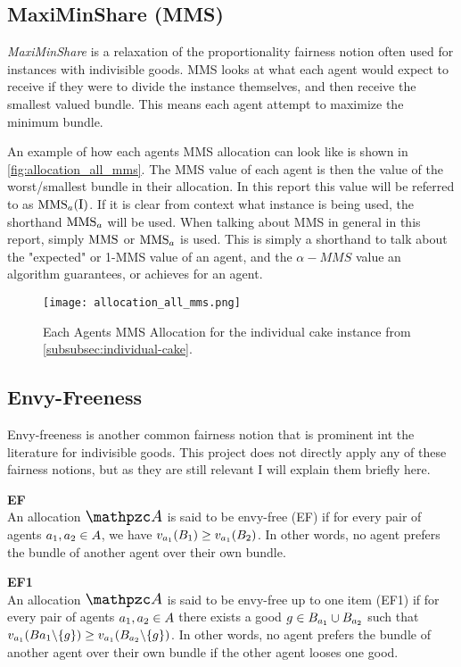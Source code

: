 \subsection*{MaxiMinShare (MMS)}
\emph{MaxiMinShare} is a relaxation of the proportionality fairness notion often used for instances with indivisible goods. MMS looks at what each agent would expect to receive if they were to divide the instance themselves, and then receive the smallest valued bundle. This means each agent attempt to maximize the minimum bundle. 

An example of how each agents MMS allocation can look like is shown in \autoref{fig:allocation_all_mms}. The MMS value of each agent is then the value of the worst/smallest bundle in their allocation. In this report this value will be referred to as $\MMS_\sAgent(\sInstance)$. If it is clear from context what instance is being used, the shorthand $\text{MMS}_a$ will be used. When talking about MMS in general in this report, simply $\text{MMS}$ or $\text{MMS}_a$ is used. This is simply a shorthand to talk about the "expected" or 1-MMS value of an agent, and the $\alpha-MMS$ value an algorithm guarantees, or achieves for an agent. 
\begin{figure}
    \centering
    \texttt{[image: allocation\_all\_mms.png]}
    \caption{Each Agents MMS Allocation for the individual cake instance from \autoref{subsubsec:individual-cake}.}
    \label{fig:allocation_all_mms}
\end{figure}



\subsection*{Envy-Freeness}
Envy-freeness is another common fairness notion that is prominent int the literature for indivisible goods. This project does not directly apply any of these fairness notions, but as they are still relevant I will explain them briefly here.  

\textbf{EF}\\
An allocation $\sAllocation$ is said to be envy-free (EF) if for every pair of agents $a_1,a_2 \in A$, we have $v_{a_1}(B_1) \geq v_{a_1}(B_2)$. In other words, no agent prefers the bundle of another agent over their own bundle.

\textbf{EF1}\\
An allocation $\sAllocation$ is said to be envy-free up to one item (EF1) if for every pair of agents $a_1,a_2 \in A$ there exists a good $g \in B_{a_1} \cup B_{a_2}$ such that $v_{a_1}(B{a_1} \backslash \{g\}) \geq v_{a_1}(B_{a_2} \backslash \{g\})$. In other words, no agent prefers the bundle of another agent over their own bundle if the other agent looses one good.


